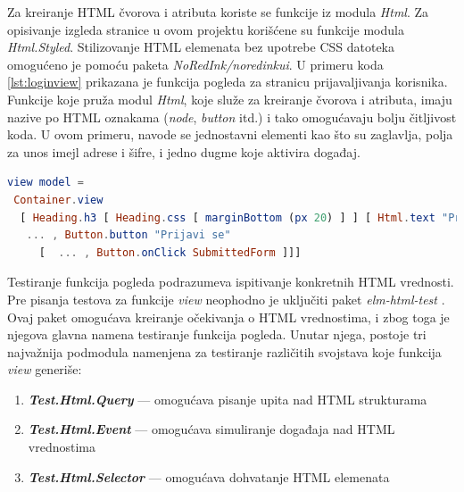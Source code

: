 \documentclass[12pt,oneside]{memoir}
\begin{document}
\par Za kreiranje HTML čvorova i atributa koriste se funkcije iz modula \emph{Html}. Za opisivanje izgleda stranice u ovom projektu korišćene su funkcije modula \emph{Html.Styled}. Stilizovanje HTML elemenata bez upotrebe CSS datoteka omogućeno je pomoću paketa \emph{NoRedInk/noredinkui}. U primeru koda \ref{lst:loginview} prikazana je funkcija pogleda za stranicu prijavaljivanja korisnika. Funkcije koje pruža modul \emph{Html}, koje služe za kreiranje čvorova i atributa, imaju nazive po HTML oznakama (\emph{node}, \emph{button} itd.) i tako omogućavaju bolju čitljivost koda. U ovom primeru, navode se jednostavni elementi kao što su zaglavlja, polja za unos imejl adrese i šifre, i jedno dugme koje aktivira događaj. 

\begin{minipage}{\linewidth}
\begin{lstlisting}[language=elm, basicstyle=\small, caption={Funkcija \emph{view} modula \emph{LoginPage}},captionpos=b, label={lst:loginview}]
view model =
 Container.view
  [ Heading.h3 [ Heading.css [ marginBottom (px 20) ] ] [ Html.text "Prijava korisnika" ]
   ... , Button.button "Prijavi se"
     [  ... , Button.onClick SubmittedForm ]]]
\end{lstlisting}
\end{minipage}

\par Testiranje funkcija pogleda podrazumeva ispitivanje konkretnih HTML vrednosti. Pre pisanja testova za funkcije \emph{view} neophodno je uključiti paket \emph{elm-html-test} \cite{html-elm-test}. Ovaj paket omogućava kreiranje očekivanja o HTML vrednostima, i zbog toga je njegova glavna namena testiranje funkcija pogleda. Unutar njega, postoje tri najvažnija podmodula namenjena za testiranje različitih svojstava koje funkcija \emph{view} generiše:

\begin{enumerate}
\item \textbf{\emph{Test.Html.Query}} --- omogućava pisanje upita nad HTML strukturama
\item \textbf{\emph{Test.Html.Event}} --- omogućava simuliranje događaja nad HTML vrednostima
\item \textbf{\emph{Test.Html.Selector}} --- omogućava dohvatanje HTML elemenata
\end{enumerate}
\end{document}
